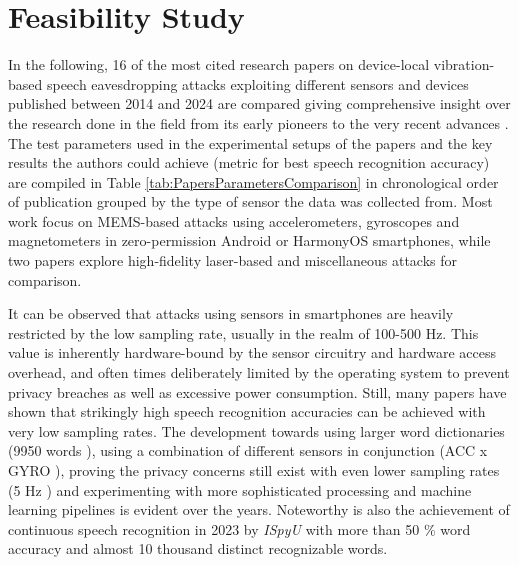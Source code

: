 \documentclass[sigconf, nonacm]{acmart}
\begin{document}
\section{Feasibility Study}
\begin{sloppypar}
  In the following, 16 of the most cited research papers on device-local vibration-based speech eavesdropping attacks exploiting different sensors and devices published between 2014 and 2024 are compared giving comprehensive insight over the research done in the field from its early pioneers to the very recent advances \cite{Gyrophone2014}\cite{AccelWorld2015}\cite{PitchIn2017}\cite{Speechless2018}\cite{KineticSongComprehension2019}\cite{AccelEve2020}\cite{Spearphone2021}\cite{Vibphone2021}\cite{AccMyrinx2022}\cite{InertiEAR2022}\cite{ISpyU2023}\cite{VoiceListener2023}\cite{StealthyIMU2023}\cite{WatchTheRhythm2024}\cite{LidarPhone2020}\cite{HardDriveOfHearing2019}.
  The test parameters used in the experimental setups of the papers and the key results the authors could achieve (metric for best speech recognition accuracy) are compiled in Table \ref{tab:PapersParametersComparison} in chronological order of publication grouped by the type of sensor the data was collected from.
  Most work focus on MEMS-based attacks using accelerometers, gyroscopes and magnetometers in zero-permission Android or HarmonyOS smartphones, while two papers explore high-fidelity laser-based and miscellaneous attacks for comparison.
\end{sloppypar}
It can be observed that attacks using sensors in smartphones are heavily restricted by the low sampling rate, usually in the realm of 100-500 Hz.
This value is inherently hardware-bound by the sensor circuitry and hardware access overhead, and often times deliberately limited by the operating system to prevent privacy breaches as well as excessive power consumption.
Still, many papers have shown that strikingly high speech recognition accuracies can be achieved with very low sampling rates.
The development towards using larger word dictionaries (9950 words \cite{ISpyU2023}), using a combination of different sensors in conjunction (ACC x GYRO \cite{InertiEAR2022}), proving the privacy concerns still exist with even lower sampling rates (5 Hz \cite{WatchTheRhythm2024}) and experimenting with more sophisticated processing and machine learning pipelines is evident over the years.
Noteworthy is also the achievement of continuous speech recognition in 2023 by \textit{ISpyU} \cite{ISpyU2023} with more than 50 \% word accuracy and almost 10 thousand distinct recognizable words.
\end{document}
